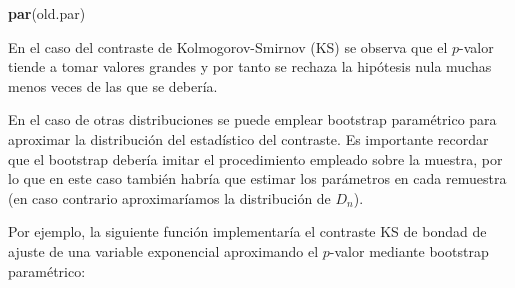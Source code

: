 \documentclass[
]{book}
\newenvironment{Shaded}{\begin{snugshade}}{\end{snugshade}}
\newcommand{\KeywordTok}[1]{\textcolor[rgb]{0.13,0.29,0.53}{\textbf{#1}}}
\newcommand{\NormalTok}[1]{#1}
\theoremstyle{break}
\theoremstyle{definition}
\theoremstyle{definition}
\theoremstyle{definition}
\theoremstyle{remark}
\begin{document}
\begin{Shaded}
\begin{Highlighting}[]
\KeywordTok{par}\NormalTok{(old.par)}
\end{Highlighting}
\end{Shaded}

En el caso del contraste de Kolmogorov-Smirnov (KS) se observa que el \(p\)-valor
tiende a tomar valores grandes y por tanto se rechaza la hipótesis nula
muchas menos veces de las que se debería.

En el caso de otras distribuciones se puede emplear bootstrap paramétrico para
aproximar la distribución del estadístico del contraste.
Es importante recordar que el bootstrap debería imitar el procedimiento
empleado sobre la muestra, por lo que en este caso también habría que estimar
los parámetros en cada remuestra
(en caso contrario aproximaríamos la distribución de \(D_n\)).

Por ejemplo, la siguiente función implementaría el contraste KS de
bondad de ajuste de una variable exponencial aproximando el
\(p\)-valor mediante bootstrap paramétrico:
\end{document}
